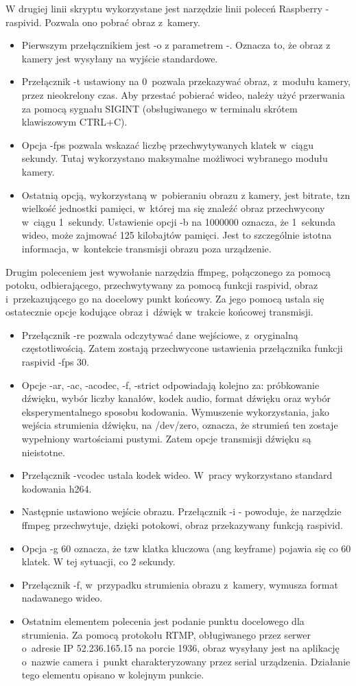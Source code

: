 W drugiej linii skryptu wykorzystane jest narzędzie linii poleceń Raspberry - raspivid. Pozwala ono pobrać obraz z~kamery. 
\begin{itemize}
\item Pierwszym przełącznikiem jest -o z parametrem -. Oznacza to, że obraz z kamery jest wysyłany na wyjście standardowe.
\item Przełącznik -t ustawiony na 0~pozwala przekazywać obraz, z~modułu kamery, przez nieokrelony czas. Aby przestać pobierać wideo, należy użyć przerwania za pomocą sygnału SIGINT (obsługiwanego w terminalu skrótem klawiszowym CTRL+C).
\item Opcja -fps pozwala wskazać liczbę przechwytywanych klatek w~ciągu sekundy. Tutaj wykorzystano maksymalne możliwoci wybranego modułu kamery.
\item Ostatnią opcją, wykorzystaną w~pobieraniu obrazu z kamery, jest bitrate, tzn wielkość jednostki pamięci, w~której ma się znaleźć obraz przechwycony w~ciągu 1~sekundy. Ustawienie opcji -b na 1000000 oznacza, że 1~sekunda wideo, może zajmować 125 kilobajtów pamięci. Jest to szczególnie istotna informacja, w~kontekcie transmisji obrazu poza urządzenie.
\end{itemize}

Drugim poleceniem jest wywołanie narzędzia ffmpeg, połączonego za pomocą potoku, odbierającego, przechwytywany za pomocą funkcji raspivid, obraz i~przekazującego go na docelowy punkt końcowy. Za jego pomocą ustala się ostatecznie opcje kodujące obraz i~dźwięk w~trakcie końcowej transmisji.
\begin{itemize}
\item Przełącznik -re pozwala odczytywać dane wejściowe, z~oryginalną częstotliwością. Zatem zostają przechwycone ustawienia przełącznika funkcji raspivid -fps 30.
\item Opcje  -ar, -ac, -acodec, -f, -strict odpowiadają kolejno za: próbkowanie dźwięku, wybór liczby kanałów, kodek audio, format dźwięku oraz wybór eksperymentalnego sposobu kodowania. Wymuszenie wykorzystania, jako wejścia strumienia dźwięku, na /dev/zero, oznacza, że strumień ten zostaje wypełniony wartościami pustymi. Zatem opcje transmisji dźwięku są nieistotne.
\item Przełącznik -vcodec ustala kodek wideo. W~pracy wykorzystano standard kodowania h264.
\item Następnie ustawiono wejście obrazu. Przełącznik -i - powoduje, że narzędzie ffmpeg przechwytuje, dzięki potokowi, obraz przekazywany funkcją raspivid.
\item Opcja -g 60 oznacza, że tzw klatka kluczowa (ang keyframe) pojawia się co 60 klatek. W tej sytuacji, co 2 sekundy. 
\item Przełącznik -f, w~przypadku strumienia obrazu z~kamery, wymusza format nadawanego wideo.  
\item Ostatnim elementem polecenia jest podanie punktu docelowego dla strumienia. Za pomocą protokołu RTMP, obługiwanego przez serwer o~adresie IP 52.236.165.15 na porcie 1936, obraz wysyłany jest na aplikację o~nazwie camera i~punkt charakteryzowany przez serial urządzenia. Działanie tego elementu opisano w kolejnym punkcie. 
\end{itemize}

